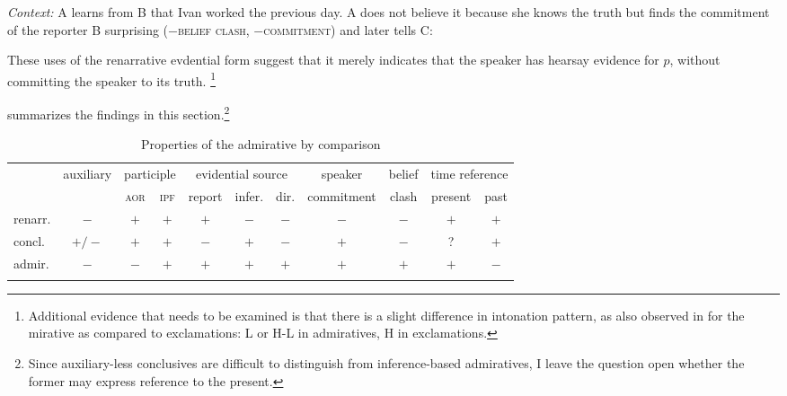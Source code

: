 \documentclass[output=paper,
colorlinks,
citecolor=brown,
newtxmath
]{langscibook}
\begin{document}
\eanoraggedright\label{ex:what-a-lie}
\textit{Context:} A learns from B that Ivan worked the previous day. A does not believe it because she knows the truth but finds the commitment of the reporter B surprising ($-$\textsc{belief clash}, $-$\textsc{commitment}) and later tells C:\vspace{-6pt}
\z
\begin{exe}
\end{exe}

\noindent These uses of the  renarrative evdential form suggest that it merely indicates that the speaker has hearsay evidence for $p$, without committing the speaker to its truth.%
\footnote{Additional evidence that needs to be examined is that there is a slight difference in intonation pattern, as also observed in \citet[152--153]{Bustamante2013} for the  mirative as compared to  exclamations: L or H-L in admiratives, H in exclamations.}

 summarizes the findings in this section.\footnote{Since auxiliary-less conclusives are difficult to distinguish from inference-based admiratives, I leave the question open whether the former may express reference to the present.}

\begin{table}[h]
\centering
\small
\setlength\tabcolsep{3.4pt}
\caption{Properties of the admirative by comparison}
\label{properties-admir}
\begin{tabularx}{\textwidth}{lcccccccccc}
\lsptoprule
& \multirow{2}{*}{\small auxiliary} & \multicolumn{2}{c}{ \small{participle}} & \multicolumn{3}{c}{ \small{evidential source}} & \small{speaker} & \small{belief} & \multicolumn{2}{c}{ \small{time reference}}\\
& & \textsc{aor} &\textsc{ipf} & \small{report} & \small{infer.} & \small{dir.} & \small{commitment} & \small{clash}& \small{present} & \small{past}\\
 \midrule
renarr.& $-$ & $+$ & $+$ & $+$ & $-$ & $-$ & $-$ & $-$ & $+$ & $+$\smallskip\\
concl.& $+/-$ & $+$ & $+$ & $-$ & $+$ & $-$ & $+$ & $-$ & ? & $+$\smallskip\\
admir.& $-$ & $-$ & $+$ & $+$ & $+$ & $+$ & $+$ & $+$ & $+$ & $-$ \\
 \lspbottomrule
\end{tabularx}
\end{table}
\end{document}

